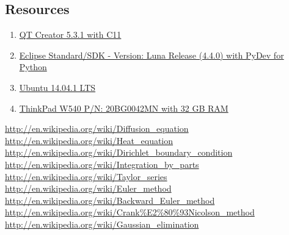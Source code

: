\documentclass[11pt,english,a4paper]{article}
\begin{document}
\begin{flushleft}
\section{Resources}

\begin{enumerate}
\item{\href{http://qt-project.org/downloads}{QT Creator 5.3.1 with C11}}
\item{\href{https://www.eclipse.org/downloads/}{Eclipse Standard/SDK  - Version: Luna Release (4.4.0) with PyDev for Python}}
\item{\href{http://www.ubuntu.com/download/desktop}{Ubuntu 14.04.1 LTS}}
\item{\href{http://shop.lenovo.com/no/en/laptops/thinkpad/w-series/w540/#tab-reseller}{ThinkPad W540 P/N: 20BG0042MN with 32 GB RAM}}
\end{enumerate}

\begin{thebibliography}{1}
\href{http://en.wikipedia.org/wiki/Diffusion\_equation}{http://en.wikipedia.org/wiki/Diffusion\_equation}
\href{http://en.wikipedia.org/wiki/Heat\_equation}{http://en.wikipedia.org/wiki/Heat\_equation}
\href{http://en.wikipedia.org/wiki/Dirichlet\_boundary\_condition}{http://en.wikipedia.org/wiki/Dirichlet\_boundary\_condition}
\href{http://en.wikipedia.org/wiki/Integration\_by\_parts}{http://en.wikipedia.org/wiki/Integration\_by\_parts}
\href{http://en.wikipedia.org/wiki/Taylor\_series}{http://en.wikipedia.org/wiki/Taylor\_series}
\href{http://en.wikipedia.org/wiki/Euler\_method}{http://en.wikipedia.org/wiki/Euler\_method}
\href{http://en.wikipedia.org/wiki/Backward\_Euler\_method}{http://en.wikipedia.org/wiki/Backward\_Euler\_method}
\href{http://en.wikipedia.org/wiki/Crank\%E2\%80\%93Nicolson\_method}{http://en.wikipedia.org/wiki/Crank\%E2\%80\%93Nicolson\_method}
\href{http://en.wikipedia.org/wiki/Gaussian\_elimination}{http://en.wikipedia.org/wiki/Gaussian\_elimination}
\end{thebibliography}

\end{flushleft}
\end{document}
